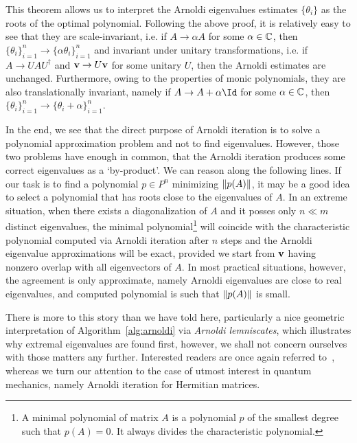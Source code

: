 This theorem allows us to interpret the Arnoldi eigenvalues estimates \(\{\theta_i\}\) as the roots of the optimal
polynomial. Following the above proof, it is relatively easy to see that they are scale-invariant, i.e.
if \(A\to\alpha A\) for some \(\alpha\in\mathbb{C}\), then \(\{\theta_i\}_{i=1}^n \to \{\alpha\theta_i\}_{i=1}^n\)
and invariant under unitary transformations, i.e. if \(A\to UAU^{\dagger}\) and \(\vectorbold{v}\to U\vectorbold{v}\) for
some unitary \(U\), then the Arnoldi estimates are unchanged. Furthermore, owing to the properties of monic polynomials,
they are also translationally invariant, namely if \(A\to A + \alpha \Id\) for some \(\alpha\in\mathbb{C}\), then
\(\{\theta_i\}_{i=1}^n \to \{\theta_i + \alpha\}_{i=1}^n\).

In the end, we see that the direct purpose of Arnoldi iteration is to solve a polynomial approximation problem
and not to find eigenvalues. However, those two problems have enough in common, that the Arnoldi iteration
produces some correct eigenvalues as a `by-product'. We can reason along the following lines. If our task
is to find a polynomial \(p\in P^n\) minimizing \(\norm{p(A)}\), it may be a good idea to select a polynomial
that has roots close to the eigenvalues of \(A\).  In an extreme situation, when there exists a diagonalization
of \(A\) and it posses only \(n\ll m\) distinct eigenvalues, the minimal polynomial\footnote{A minimal polynomial
of matrix \(A\) is a polynomial \(p\) of the smallest degree such that \(p(A) = 0\). It always divides the
characteristic polynomial.} will coincide with the characteristic polynomial computed via Arnoldi iteration
after \(n\) steps and the Arnoldi eigenvalue approximations will be exact,
provided we start from \(\vectorbold{v}\) having nonzero overlap with all eigenvectors of \(A\).
In most practical situations, however, the agreement is only approximate, namely Arnoldi eigenvalues are close to real
eigenvalues, and computed polynomial is such that \(\norm{p(A)}\) is small.

There is more to this story than we have told here, particularly a nice geometric interpretation
of Algorithm~\ref{alg:arnoldi} via \textit{Arnoldi lemniscates}, which illustrates why extremal eigenvalues
are found first, however, we shall not concern ourselves with those
matters any further. Interested readers are once again referred to~\textcite{Trefethen1997},
whereas we turn our attention to the case of utmost interest in quantum mechanics, namely Arnoldi iteration
for Hermitian matrices.

